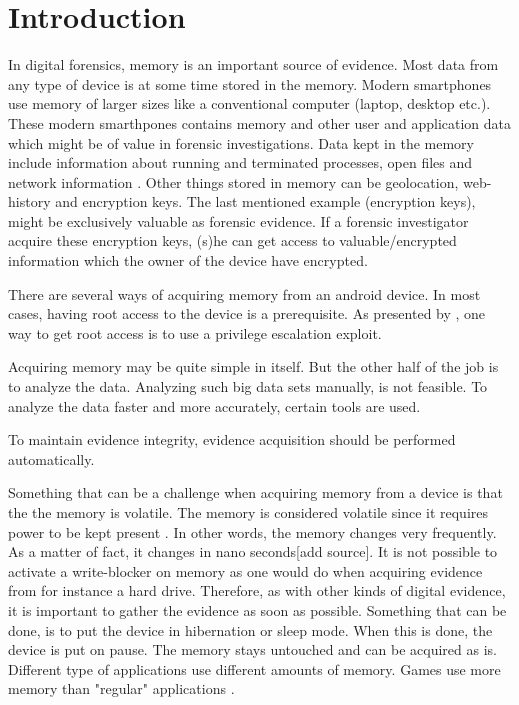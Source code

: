 \section{Introduction}


In digital forensics, memory is an important source of evidence. Most data from any type of device
is at some time stored in the memory.
Modern smartphones use memory of larger sizes like a conventional computer (laptop, desktop etc.).
These modern smarthpones contains memory and other user and application data which
might be of value in forensic investigations.
Data kept in the memory include information about running and terminated processes, open files and network
information \cite{acq_vol_android_mem}. Other things stored in memory can be geolocation, web-history and
encryption keys. The last mentioned example (encryption keys), might be exclusively valuable as forensic evidence.
If a forensic investigator acquire these encryption keys, (s)he can get access to valuable/encrypted
information which the owner of the device have encrypted.

There are several ways of acquiring memory from an android device. In most cases, having root access to the device
is a prerequisite. As presented by \cite{acq_vol_android_mem}, one way to get root access is to use a
privilege escalation exploit. %

Acquiring memory may be quite simple in itself. But the other half of the job is to analyze the data.
Analyzing such big data sets manually, is not feasible. To analyze the data faster and more accurately, certain tools
are used.

To maintain evidence integrity, evidence acquisition should be performed automatically.

Something that can be a challenge when acquiring memory from a device is that the the memory is volatile.
The memory is considered volatile since it requires power to be kept present \cite{the_art_of_mem}.
In other words, the memory changes very frequently. As a matter of fact, it changes in nano
seconds[add source]. It is not possible to activate a write-blocker on memory as one would do when acquiring
evidence from for instance a hard drive. Therefore, as with other kinds of digital evidence, it is important to
gather the evidence as soon as possible. Something that can be done, is to put the device in hibernation or sleep mode.
When this is done, the device is put on pause. The memory stays untouched and can be acquired as is.
Different type of applications use different amounts of memory. Games use more memory than "regular" applications \cite{}.

